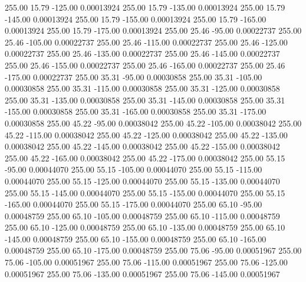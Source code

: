     255.00     15.79   -125.00     0.00013924
    255.00     15.79   -135.00     0.00013924
    255.00     15.79   -145.00     0.00013924
    255.00     15.79   -155.00     0.00013924
    255.00     15.79   -165.00     0.00013924
    255.00     15.79   -175.00     0.00013924
    255.00     25.46    -95.00     0.00022737
    255.00     25.46   -105.00     0.00022737
    255.00     25.46   -115.00     0.00022737
    255.00     25.46   -125.00     0.00022737
    255.00     25.46   -135.00     0.00022737
    255.00     25.46   -145.00     0.00022737
    255.00     25.46   -155.00     0.00022737
    255.00     25.46   -165.00     0.00022737
    255.00     25.46   -175.00     0.00022737
    255.00     35.31    -95.00     0.00030858
    255.00     35.31   -105.00     0.00030858
    255.00     35.31   -115.00     0.00030858
    255.00     35.31   -125.00     0.00030858
    255.00     35.31   -135.00     0.00030858
    255.00     35.31   -145.00     0.00030858
    255.00     35.31   -155.00     0.00030858
    255.00     35.31   -165.00     0.00030858
    255.00     35.31   -175.00     0.00030858
    255.00     45.22    -95.00     0.00038042
    255.00     45.22   -105.00     0.00038042
    255.00     45.22   -115.00     0.00038042
    255.00     45.22   -125.00     0.00038042
    255.00     45.22   -135.00     0.00038042
    255.00     45.22   -145.00     0.00038042
    255.00     45.22   -155.00     0.00038042
    255.00     45.22   -165.00     0.00038042
    255.00     45.22   -175.00     0.00038042
    255.00     55.15    -95.00     0.00044070
    255.00     55.15   -105.00     0.00044070
    255.00     55.15   -115.00     0.00044070
    255.00     55.15   -125.00     0.00044070
    255.00     55.15   -135.00     0.00044070
    255.00     55.15   -145.00     0.00044070
    255.00     55.15   -155.00     0.00044070
    255.00     55.15   -165.00     0.00044070
    255.00     55.15   -175.00     0.00044070
    255.00     65.10    -95.00     0.00048759
    255.00     65.10   -105.00     0.00048759
    255.00     65.10   -115.00     0.00048759
    255.00     65.10   -125.00     0.00048759
    255.00     65.10   -135.00     0.00048759
    255.00     65.10   -145.00     0.00048759
    255.00     65.10   -155.00     0.00048759
    255.00     65.10   -165.00     0.00048759
    255.00     65.10   -175.00     0.00048759
    255.00     75.06    -95.00     0.00051967
    255.00     75.06   -105.00     0.00051967
    255.00     75.06   -115.00     0.00051967
    255.00     75.06   -125.00     0.00051967
    255.00     75.06   -135.00     0.00051967
    255.00     75.06   -145.00     0.00051967
